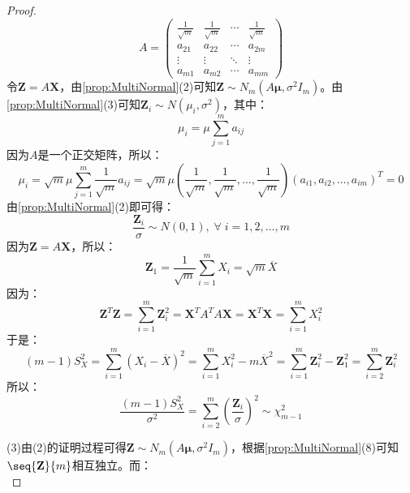 \begin{proof}
\begin{equation*}
		A=
		\begin{pmatrix}
			\frac{1}{\sqrt{m}} & \frac{1}{\sqrt{m}} & \cdots & \frac{1}{\sqrt{m}} \\
			a_{21} & a_{22} & \cdots & a_{2m} \\
			\vdots & \vdots & \ddots & \vdots \\
			a_{m1} & a_{m2} & \cdots & a_{mm}
		\end{pmatrix}
	\end{equation*}
	令$\mathbf{Z}=A\mathbf{X}$，由\cref{prop:MultiNormal}(2)可知$\mathbf{Z}\sim N_m(A\boldsymbol{\mu},\sigma^2I_m)$。由\cref{prop:MultiNormal}(3)可知$\mathbf{Z}_i\sim N(\mu_i,\sigma^2)$，其中：
	\begin{equation*}
		\mu_i=\mu\sum_{j=1}^{m}a_{ij}
	\end{equation*}
	因为$A$是一个正交矩阵，所以：
	\begin{equation*}
		\mu_i=\sqrt{m}\mu\sum_{j=1}^{m}\frac{1}{\sqrt{m}}a_{ij}=\sqrt{m}\mu\left(\dfrac{1}{\sqrt{m}},\dfrac{1}{\sqrt{m}},\dots,\dfrac{1}{\sqrt{m}}\right)(a_{i1},a_{i2},\dots,a_{im})^T=0
	\end{equation*}
	由\cref{prop:MultiNormal}(2)即可得：
	\begin{equation*}
		\frac{\mathbf{Z}_i}{\sigma}\sim N(0,1),\;\forall\;i=1,2,\dots,m
	\end{equation*}
	因为$\mathbf{Z}=A\mathbf{X}$，所以：
	\begin{equation*}
		\mathbf{Z}_1=\frac{1}{\sqrt{m}}\sum_{i=1}^{m}X_i=\sqrt{m}\overline{X}
	\end{equation*}
	因为：
	\begin{equation*}
		\mathbf{Z}^T\mathbf{Z}=\sum_{i=1}^{m}\mathbf{Z}_i^2=\mathbf{X}^TA^TA\mathbf{X}=\mathbf{X}^T\mathbf{X}=\sum_{i=1}^{m}X_i^2
	\end{equation*}
	于是：
	\begin{equation*}
		(m-1)S_X^2=\sum_{i=1}^{m}(X_i-\overline{X})^2=\sum_{i=1}^{m}X_i^2-m\overline{X}^2=\sum_{i=1}^{m}\mathbf{Z}_i^2-\mathbf{Z}_1^2=\sum_{i=2}^{m}\mathbf{Z}_i^2
	\end{equation*}
	所以：
	\begin{equation*}
		\frac{(m-1)S_X^2}{\sigma^2}=\sum_{i=2}^{m}\left(\frac{\mathbf{Z}_i}{\sigma}\right)^2\sim\chi_{m-1}^2
	\end{equation*}\par
	(3)由(2)的证明过程可得$\mathbf{Z}\sim N_m(A\boldsymbol{\mu},\sigma^2I_m)$，根据\cref{prop:MultiNormal}(8)可知$\seq{\mathbf{Z}}{m}$相互独立。而：
	\begin{equation*}

\end{equation*}
\end{proof}
